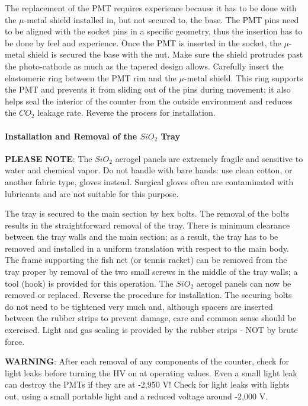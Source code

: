 {The replacement of the PMT requires experience because it has to be done with the
$\mu$-metal shield installed in, but not secured to, the base. The PMT pins
need to be aligned with the socket pins in a specific geometry, thus the
insertion has to be done by feel and experience. Once the PMT is inserted in
the socket, the $\mu$-metal shield is secured the base with the nut. Make sure
the shield protrudes past the photo-cathode as much as the tapered design
allows. Carefully insert the elastomeric ring between the PMT rim and the
$\mu$-metal shield. This ring supports the PMT and prevents it from sliding 
out of the pins during movement; it also helps seal the interior of the counter
from the outside environment and reduces the $CO_2$ leakage rate. 
Reverse the process for installation.

\paragraph{Installation and Removal of the $SiO_2$ Tray}

{\bf PLEASE NOTE}: The $SiO_2$ aerogel panels are extremely fragile and sensitive to 
water and chemical vapor. Do not handle with bare hands: use clean cotton, or 
another fabric type, gloves instead. Surgical gloves often are contaminated with 
lubricants and are not suitable for this purpose. 

The tray is secured to the main section by hex bolts. The removal of the bolts 
results in the straightforward removal of the tray. There is minimum clearance 
between the tray walls and the main section; as a result, the tray has to 
be removed and installed in a uniform translation with respect to the main 
body. The frame supporting the fish net (or tennis racket) can be removed from 
the tray proper by removal of the two small screws in the middle of the tray 
walls; a tool (hook) is provided for this operation. The $SiO_2$ aerogel 
panels can now be removed or replaced. Reverse the procedure for installation.
The securing bolts do not need to be tightened very much and, although spacers 
are inserted between the rubber strips to prevent damage, care and common sense 
 should be exercised. Light and gas sealing is provided by the 
rubber strips - NOT by brute force.

{\bf WARNING}: After each removal of any components of the counter, check for light 
leaks before turning the HV on at operating values. Even a small light 
leak can destroy the PMTs if they are at -2,950 V! Check for light leaks with 
lights out, using a small portable light and a reduced voltage around -2,000 V.

}
